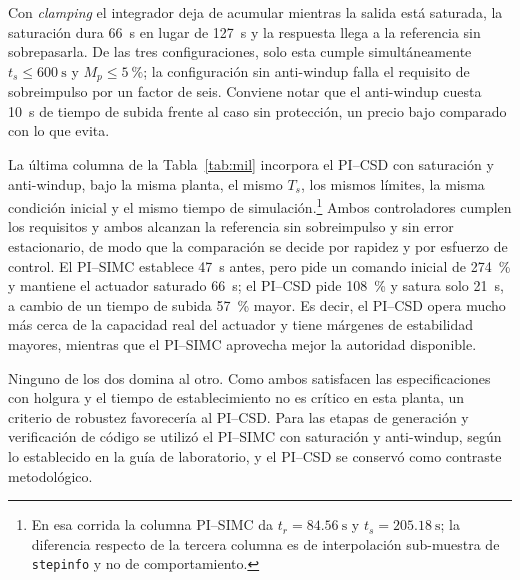 Con \emph{clamping} el integrador deja de acumular mientras la salida está saturada, la saturación
dura \SI{66}{\second} en lugar de \SI{127}{\second} y la respuesta llega a la referencia sin
sobrepasarla. De las tres configuraciones, solo esta cumple simultáneamente
$t_s \leq \SI{600}{\second}$ y $M_p \leq \SI{5}{\percent}$; la configuración sin anti-windup falla
el requisito de sobreimpulso por un factor de seis. Conviene notar que el anti-windup cuesta
\SI{10}{\second} de tiempo de subida frente al caso sin protección, un precio bajo comparado con lo
que evita.

La última columna de la Tabla~\ref{tab:mil} incorpora el PI--CSD con saturación y anti-windup, bajo
la misma planta, el mismo $T_s$, los mismos límites, la misma condición inicial y el mismo tiempo de
simulación.\footnote{En esa corrida la columna PI--SIMC da $t_r = \SI{84.56}{\second}$ y
$t_s = \SI{205.18}{\second}$; la diferencia respecto de la tercera columna es de interpolación
sub-muestra de \texttt{stepinfo} y no de comportamiento.} Ambos controladores cumplen los
requisitos y ambos alcanzan la referencia sin sobreimpulso y sin error estacionario, de modo que la
comparación se decide por rapidez y por esfuerzo de control. El PI--SIMC establece \SI{47}{\second}
antes, pero pide un comando inicial de \SI{274}{\percent} y mantiene el actuador saturado
\SI{66}{\second}; el PI--CSD pide \SI{108}{\percent} y satura solo \SI{21}{\second}, a cambio de un
tiempo de subida \SI{57}{\percent} mayor. Es decir, el PI--CSD opera mucho más cerca de la
capacidad real del actuador y tiene márgenes de estabilidad mayores, mientras que el PI--SIMC
aprovecha mejor la autoridad disponible.

Ninguno de los dos domina al otro. Como ambos satisfacen las especificaciones con holgura y el
tiempo de establecimiento no es crítico en esta planta, un criterio de robustez favorecería al
PI--CSD. Para las etapas de generación y verificación de código se utilizó el PI--SIMC con
saturación y anti-windup, según lo establecido en la guía de laboratorio, y el PI--CSD se conservó
como contraste metodológico.
